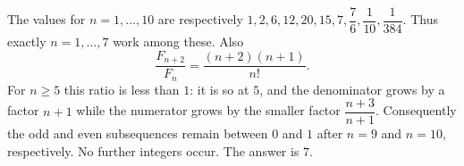 The values for $n=1,\ldots,10$ are respectively $1,2,6,12,20,15,7,\dfrac{7}{6},\dfrac{1}{10},\dfrac{1}{384}$. Thus exactly $n=1,\ldots,7$ work among these. Also\[\dfrac{F_{n+2}}{F_n}=\dfrac{(n+2)(n+1)}{n!}.\]For $n\ge5$ this ratio is less than $1$: it is so at $5$, and the denominator grows by a factor $n+1$ while the numerator grows by the smaller factor $\dfrac{n+3}{n+1}$. Consequently the odd and even subsequences remain between $0$ and $1$ after $n=9$ and $n=10$, respectively. No further integers occur. The answer is $\boxed7$.
